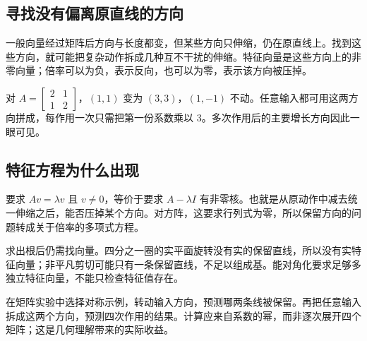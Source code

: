 \subsection*{寻找没有偏离原直线的方向}
一般向量经过矩阵后方向与长度都变，但某些方向只伸缩，仍在原直线上。找到这些方向，就可能把复杂动作拆成几种互不干扰的伸缩。特征向量是这些方向上的非零向量；倍率可以为负，表示反向，也可以为零，表示该方向被压掉。

对 $A=\left[\begin{smallmatrix}2&1\\1&2\end{smallmatrix}\right]$，$(1,1)$ 变为 $(3,3)$，$(1,-1)$ 不动。任意输入都可用这两方向拼成，每作用一次只需把第一份系数乘以 $3$。多次作用后的主要增长方向因此一眼可见。

\subsection*{特征方程为什么出现}
要求 $Av=\lambda v$ 且 $v\ne0$，等价于要求 $A-\lambda I$ 有非零核。也就是从原动作中减去统一伸缩之后，能否压掉某个方向。对方阵，这要求行列式为零，所以保留方向的问题转成关于倍率的多项式方程。

求出根后仍需找向量。四分之一圈的实平面旋转没有实的保留直线，所以没有实特征向量；非平凡剪切可能只有一条保留直线，不足以组成基。能对角化要求足够多独立特征向量，不能只检查特征值存在。

在矩阵实验中选择对称示例，转动输入方向，预测哪两条线被保留。再把任意输入拆成这两个方向，预测四次作用的结果。计算应来自系数的幂，而非逐次展开四个矩阵；这是几何理解带来的实际收益。
